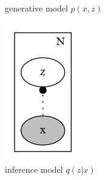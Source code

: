 \documentclass[final]{beamer}
\theoremstyle{plain}
\theoremstyle{definition}
\theoremstyle{remark}
\begin{document}
\begin{frame}
\begin{figure}[h]
\begin{subfigure}[b]{0.2\textwidth}
\caption{generative model $p(x,z)$}
\end{subfigure}
\begin{subfigure}[b]{0.2\textwidth}
\includegraphics[width=\textwidth]{plots/vae_q.gv.png}
\caption{inference model $q(z|x)$}
\end{subfigure}
\begin{subfigure}[b]{0.2\textwidth}

\end{subfigure}
\end{figure}
\end{frame}
\end{document}
